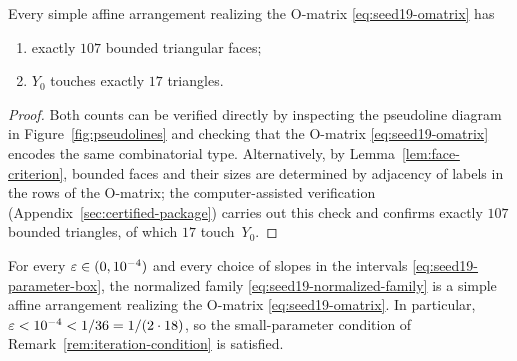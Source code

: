 \begin{lemma}\label{lem:omatrix-consequences}
Every simple affine arrangement realizing the $\mathrm{O}$-matrix
\eqref{eq:seed19-omatrix} has
\begin{enumerate}[label=(\arabic*)]
\item exactly $107$ bounded triangular faces;
\item $Y_0$ touches exactly $17$ triangles.
\end{enumerate}
\end{lemma}

\begin{proof}
Both counts can be verified directly by inspecting the pseudoline diagram in
Figure~\ref{fig:pseudolines} and checking that the $\mathrm{O}$-matrix
\eqref{eq:seed19-omatrix} encodes the same combinatorial type. Alternatively,
by Lemma~\ref{lem:face-criterion}, bounded faces and their sizes are determined
by adjacency of labels in the rows of the $\mathrm{O}$-matrix; the
computer-assisted verification (Appendix~\ref{sec:certified-package}) carries out
this check and confirms exactly $107$ bounded triangles, of which $17$
touch~$Y_0$.
\end{proof}

\begin{lemma}\label{lem:bbl-match}
For every $\varepsilon\in(0,10^{-4})$ and every choice of slopes in the
intervals \eqref{eq:seed19-parameter-box}, the normalized family
\eqref{eq:seed19-normalized-family} is a simple
affine arrangement realizing the $\mathrm{O}$-matrix
\eqref{eq:seed19-omatrix}. In particular,
$\varepsilon<10^{-4}<1/36=1/(2\cdot 18)$, so the
small-parameter condition of Remark~\ref{rem:iteration-condition} is satisfied.
\end{lemma}

